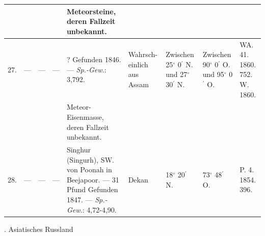 \documentclass[a4paper, 8pt, oneside, polutonikogreek, german]{article}
\begin{document}
\begin{center}
\begin{longtable}{|p{3mm}|p{8mm}|p{5mm}|p{18mm}|p{25mm}|p{15mm}|p{13mm}|p{13mm}|p{13mm}|}
          &   &   &   & Meteorsteine, deren Fallzeit unbekannt. &   &   &   & ~ \\ \hline
        27. & --- & --- & --- & ? Gefunden 1846. --- \emph{Sp.-Gew.}: 3,792. & Wahrsch- einlich aus Assam & Zwischen 25$^\circ$ 0$^\prime$ N. und 27$^\circ$ 30$^\prime$ N. & Zwischen 90$^\circ$ 0$^\prime$ O. und 95$^\circ$ 0$^\prime$ O. & WA. 41. 1860. 752. W. 1860. \\ \hline
          &   &   &   & Meteor-Eisenmasse, deren Fallzeit unbekannt. &   &   &   &   \\ \hline
        28. & --- & --- & --- & Singhur (Singurh), SW. von Poonah in Beejapoor. --- 31 Pfund Gefunden 1847. --- \emph{Sp.-Gew.}: 4,72-4,90. & Dekan & 18$^\circ$ 20$^\prime$ N. & 73$^\circ$ 48$^\prime$ O. & P. 4. 1854. 396. \\ \hline
    \end{longtable}
\end{center}
. Asiatisches Russland
\end{document}
